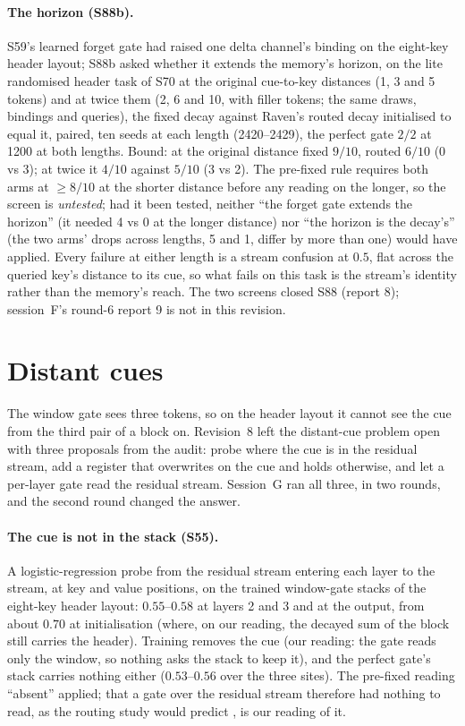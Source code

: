 \documentclass[11pt]{article}
\begin{document}
\paragraph{The horizon (S88b).} S59's learned forget gate had raised one delta channel's binding on the eight-key header layout; S88b asked whether it extends the memory's horizon, on the lite randomised header task of S70 at the original cue-to-key distances (1, 3 and 5 tokens) and at twice them (2, 6 and 10, with filler tokens; the same draws, bindings and queries), the fixed decay against Raven's routed decay initialised to equal it, paired, ten seeds at each length (2420--2429), the perfect gate $2/2$ at 1200 at both lengths. Bound: at the original distance fixed $9/10$, routed $6/10$ (0 vs 3); at twice it $4/10$ against $5/10$ (3 vs 2). The pre-fixed rule requires both arms at $\geq 8/10$ at the shorter distance before any reading on the longer, so the screen is \emph{untested}; had it been tested, neither ``the forget gate extends the horizon'' (it needed 4 vs 0 at the longer distance) nor ``the horizon is the decay's'' (the two arms' drops across lengths, 5 and 1, differ by more than one) would have applied. Every failure at either length is a stream confusion at $0.5$, flat across the queried key's distance to its cue, so what fails on this task is the stream's identity rather than the memory's reach. The two screens closed S88 (report 8); session~F's round-6 report 9 is not in this revision.

\section{Distant cues}
\label{sec:far}

The window gate sees three tokens, so on the header layout it cannot see the cue from the third pair of a block on. Revision~8 left the distant-cue problem open with three proposals from the audit: probe where the cue is in the residual stream, add a register that overwrites on the cue and holds otherwise, and let a per-layer gate read the residual stream. Session~G ran all three, in two rounds, and the second round changed the answer.

\paragraph{The cue is not in the stack (S55).} A logistic-regression probe from the residual stream entering each layer to the stream, at key and value positions, on the trained window-gate stacks of the eight-key header layout: $0.55$--$0.58$ at layers 2 and 3 and at the output, from about $0.70$ at initialisation (where, on our reading, the decayed sum of the block still carries the header). Training removes the cue (our reading: the gate reads only the window, so nothing asks the stack to keep it), and the perfect gate's stack carries nothing either ($0.53$--$0.56$ over the three sites). The pre-fixed reading ``absent'' applied; that a gate over the residual stream therefore had nothing to read, as the routing study would predict \cite{routing}, is our reading of it.
\end{document}
